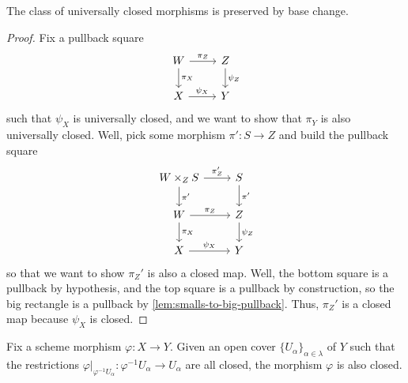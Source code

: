 \documentclass[../notes.tex]{subfiles}
\begin{document}
\begin{lemma} \label{lem:univ-closed-base-change}
	The class of universally closed morphisms is preserved by base change.
\end{lemma}
\begin{proof}
	Fix a pullback square
	\[\begin{tikzcd}
		W & Z \\
		X & Y
		\arrow["{\pi_Z}", from=1-1, to=1-2]
		\arrow["{\psi_X}", from=2-1, to=2-2]
		\arrow["{\psi_Z}", from=1-2, to=2-2]
		\arrow["{\pi_X}", from=1-1, to=2-1]
	\end{tikzcd}\]
	such that $\psi_X$ is universally closed, and we want to show that $\pi_Y$ is also universally closed. Well, pick some morphism $\pi'\colon S\to Z$ and build the pullback square
	\[\begin{tikzcd}
		{W\times_ZS} & S \\
		W & Z \\
		X & Y
		\arrow["{\pi_Z}", from=2-1, to=2-2]
		\arrow["{\psi_X}", from=3-1, to=3-2]
		\arrow["{\psi_Z}", from=2-2, to=3-2]
		\arrow["{\pi_X}", from=2-1, to=3-1]
		\arrow["{\pi'}", from=1-2, to=2-2]
		\arrow["{\pi_Z'}", from=1-1, to=1-2]
		\arrow["{\pi'}", from=1-1, to=2-1]
	\end{tikzcd}\]
	so that we want to show $\pi_Z'$ is also a closed map. Well, the bottom square is a pullback by hypothesis, and the top square is a pullback by construction, so the big rectangle is a pullback by \autoref{lem:smalls-to-big-pullback}. Thus, $\pi_Z'$ is a closed map because $\psi_X$ is closed.
\end{proof}
\begin{lemma} \label{lem:closed-is-local-target}
	Fix a scheme morphism $\varphi\colon X\to Y$. Given an open cover $\{U_\alpha\}_{\alpha\in\lambda}$ of $Y$ such that the restrictions $\varphi|_{\varphi^{-1}U_\alpha}\colon\varphi^{-1}U_\alpha\to U_\alpha$ are all closed, the morphism $\varphi$ is also closed.
\end{lemma}
\end{document}
